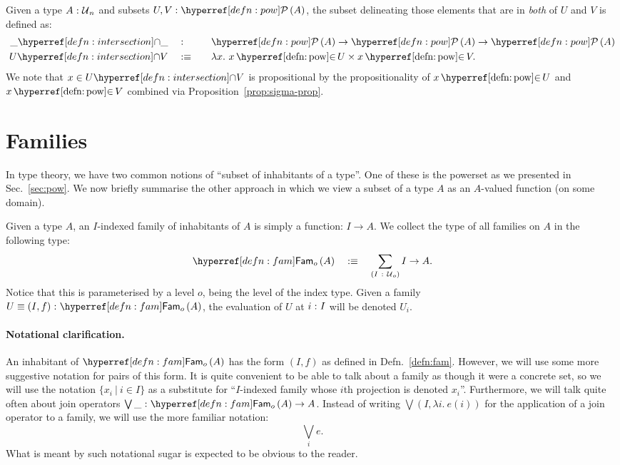\begin{defn}\label{defn:intersection}
  Given a type $A\hspace{0.1mm}:\hspace{0.1mm}\mathcal{U}{}_n$ and subsets $\oftyII{U}{V}{\pow{A}}$, the subset
  delineating those elements that are in \emph{both} of $U$ and $V$ is defined as:
  \begin{alignat*}{2}
    \intersect{\_}{\_}  \quad&:\quad   && \pow{A} \rightarrow \pow{A} \rightarrow \pow{A}         \\
    \intersect{U}{V}    \quad&\is\quad && \lambda x.~ \mempow{x}{U} \times \mempow{x}{V} .
  \end{alignat*}
  We note that $x \in \intersect{U}{V}$ is propositional by the propositionality of
  $\mempow{x}{U}$ and $\mempow{x}{V}$ combined via Proposition~\ref{prop:sigma-prop}.
\end{defn}

\section{Families}\label{sec:fam}

In type theory, we have two common notions of ``subset of inhabitants of a type''. One of
these is the powerset as we presented in Sec.~\ref{sec:pow}. We now briefly summarise the
other approach in which we view a subset of a type $A$ as an $A$-valued function (on some
domain).

\begin{defn}[Family]\label{defn:fam}
  Given a type $A$, an $I$-indexed family of inhabitants of $A$ is simply a function:
  $I \rightarrow A$. We collect the type of all families on $A$ in the following type:
  \begin{equation*}
    \sub{o}{A} \quad\is\quad \sigmaty{I}{\univ{}_o}{I \rightarrow A}.
  \end{equation*}
  Notice that this is parameterised by a level $o$, being the level of the index type.
  Given a family $\oftyI{U \equiv (I, f)}{\sub{o}{A}}$, the evaluation of $U$ at $i\hspace{0.1mm}:\hspace{0.1mm}I$
  will be denoted $U_i$.
\end{defn}

\paragraph*{Notational clarification.} An inhabitant of $\sub{o}{A}$ has the form
$(I, f)$ as defined in Defn.~\ref{defn:fam}. However, we will use some more suggestive
notation for pairs of this form. It is quite convenient to be able to talk about a family
as though it were a concrete set, so we will use the notation $\{ x_i ~|~ i \in I \}$ as a
substitute for ``$I$-indexed family whose $i$th projection is denoted $x_i$''. Furthermore,
we will talk quite often about join operators $\oftyI{\bigvee\_}{\sub{o}{A} \rightarrow A}$. Instead of
writing $\bigvee (I, \lambda i.~e(i))$ for the application of a join operator to a family, we will
use the more familiar notation:
\begin{equation}\label{eqn:join-syntax}
  \bigvee_i e.
\end{equation}
What is meant by such notational sugar is expected to be obvious to the reader.

